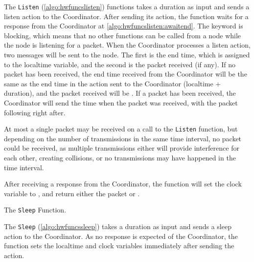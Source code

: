 The \texttt{Listen} (\autoref{algo:hwfuncslisten}) functions takes a duration as input and sends a listen action to the Coordinator. After sending its action, the function waits for a response from the Coordinator at \autoref{algo:hwfuncslisten:awaitend}. The \KwAwait keyword is blocking, which means that no other functions can be called from a node while the node is listening for a packet. When the Coordinator processes a listen action, two messages will be sent to the node. The first is the end time, which is assigned to the localtime variable, and the second is the packet received (if any). If no packet has been received, the end time received from the Coordinator will be the same as the end time in the action sent to the Coordinator (localtime $+$ duration), and the packet received will be \KwNull. If a packet has been received, the Coordinator will send the time when the packet was received, with the packet following right after.

At most a single packet may be received on a call to the \texttt{Listen} function, but depending on the number of transmissions in the same time interval, no packet could be received, as multiple transmissions either will provide interference for each other, creating collisions, or no transmissions may have happened in the time interval.

After receiving a response from the Coordinator, the function will set the clock variable to \KwNow, and return either the packet or \KwNull. \medbreak

\begin{algorithm}[ht]
    \DontPrintSemicolon
    
    
    \caption{The \texttt{Sleep} Function.}
    \label{algo:hwfuncssleep}
\end{algorithm}

The \texttt{Sleep} (\autoref{algo:hwfuncssleep}) takes a duration as input and sends a sleep action to the Coordinator. As no response is expected of the Coordinator, the function sets the localtime and clock variables immediately after sending the action. \medbreak

